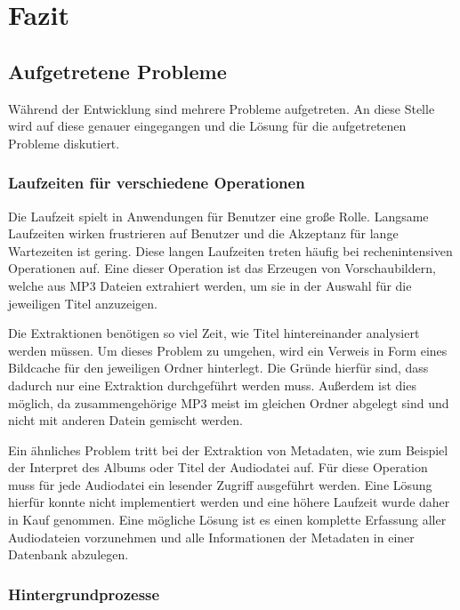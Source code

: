 \section{Fazit}

\subsection{Aufgetretene Probleme}

Während der Entwicklung sind mehrere Probleme aufgetreten. An diese Stelle wird auf diese genauer eingegangen und die Lösung für die aufgetretenen Probleme diskutiert.

\subsubsection{Laufzeiten für verschiedene Operationen}

Die Laufzeit spielt in Anwendungen für Benutzer eine große Rolle. Langsame Laufzeiten wirken frustrieren auf Benutzer und die Akzeptanz für lange Wartezeiten ist gering. Diese langen Laufzeiten treten häufig bei rechenintensiven Operationen auf. Eine dieser Operation ist das Erzeugen von Vorschaubildern, welche aus MP3 Dateien extrahiert werden, um sie in der Auswahl für die jeweiligen Titel anzuzeigen.

Die Extraktionen benötigen so viel Zeit, wie Titel hintereinander analysiert werden müssen. Um dieses Problem zu umgehen, wird ein Verweis in Form eines Bildcache für den jeweiligen Ordner hinterlegt. Die Gründe hierfür sind, dass dadurch nur eine Extraktion durchgeführt werden muss. Außerdem ist dies möglich, da zusammengehörige MP3 meist im gleichen Ordner abgelegt sind und nicht mit anderen Datein gemischt werden.

Ein ähnliches Problem tritt bei der Extraktion von Metadaten, wie zum Beispiel der Interpret des Albums oder Titel der Audiodatei auf. Für diese Operation muss für jede Audiodatei ein lesender Zugriff ausgeführt werden. Eine Lösung hierfür konnte nicht implementiert werden und eine höhere Laufzeit wurde daher in Kauf genommen. Eine mögliche Lösung ist es einen komplette Erfassung aller Audiodateien vorzunehmen und alle Informationen der Metadaten in einer Datenbank abzulegen.

\subsubsection{Hintergrundprozesse}

